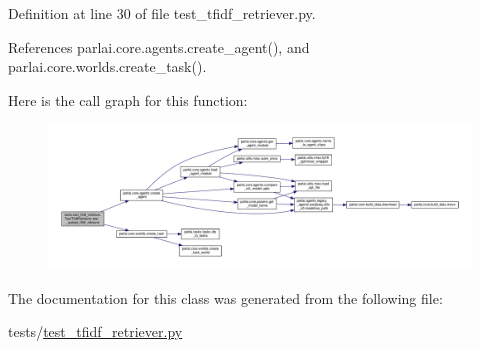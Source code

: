 Definition at line 30 of file test\+\_\+tfidf\+\_\+retriever.\+py.



References parlai.\+core.\+agents.\+create\+\_\+agent(), and parlai.\+core.\+worlds.\+create\+\_\+task().

Here is the call graph for this function\+:
\nopagebreak
\begin{figure}[H]
\begin{center}
\leavevmode
\includegraphics[width=350pt]{classtests_1_1test__tfidf__retriever_1_1TestTfidfRetriever_ad323cddfeb021a3b38a7eb4810d6ecdd_cgraph}
\end{center}
\end{figure}


The documentation for this class was generated from the following file\+:\begin{DoxyCompactItemize}
\item 
tests/\hyperlink{test__tfidf__retriever_8py}{test\+\_\+tfidf\+\_\+retriever.\+py}\end{DoxyCompactItemize}
